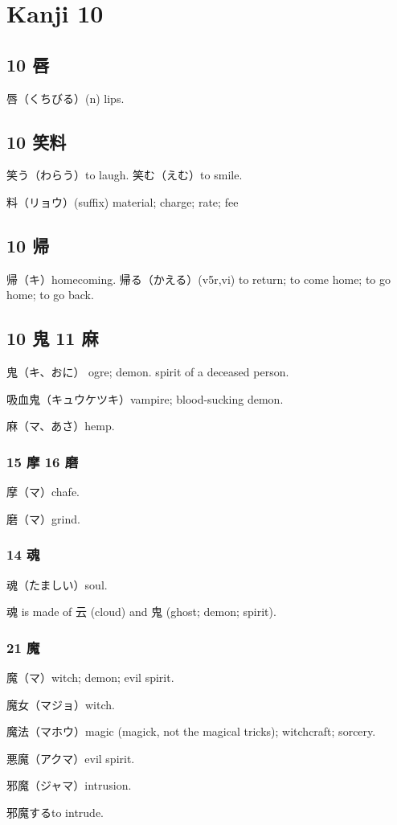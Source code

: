 \chapter{Kanji 10}

\section{10 唇}

唇（くちびる）(n) lips.

\section{10 笑料}

笑う（わらう）to laugh.
笑む（えむ）to smile.

料（リョウ）(suffix) material; charge; rate; fee

\section{10 帰}

帰（キ）homecoming.
帰る（かえる）(v5r,vi)
to return; to come home; to go home; to go back.

\section{10 鬼 11 麻}

鬼（キ、おに）
ogre; demon.
spirit of a deceased person.

吸血鬼（キュウケツキ）vampire; blood-sucking demon.

麻（マ、あさ）hemp.

\subsection{15 摩 16 磨}

摩（マ）chafe.

磨（マ）grind.

\subsection{14 魂}

魂（たましい）soul.

魂 is made of 云 (cloud) and 鬼 (ghost; demon; spirit).

\subsection{21 魔}

魔（マ）witch; demon; evil spirit.

魔女（マジョ）witch.

魔法（マホウ）magic (magick, not the magical tricks); witchcraft; sorcery.

悪魔（アクマ）evil spirit.

邪魔（ジャマ）intrusion.

邪魔するto intrude.
